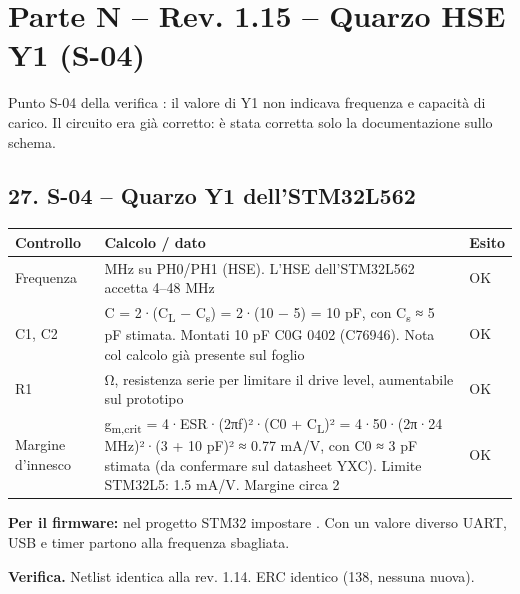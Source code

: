 \clearpage
\section[Parte N – Rev. 1.15 – Quarzo HSE Y1 (S-04)]{Parte N – Rev. 1.15 – Quarzo HSE Y1 (S-04)}

Punto S-04 della verifica : il valore di Y1 non indicava frequenza e capacità di carico. Il circuito era già corretto: è stata corretta solo la documentazione sullo schema.

\subsection[27. S-04 – Quarzo Y1 dell'STM32L562]{27. S-04 – Quarzo Y1 dell'STM32L562 }

{\small{}\setlength{\tabcolsep}{4pt}\renewcommand{\arraystretch}{1.1}
\begin{longtable}{>{\raggedright\arraybackslash}p{}>{\raggedright\arraybackslash}p{}>{\raggedright\arraybackslash}p{}}
\toprule
\textbf{Controllo} & \textbf{Calcolo /\allowbreak{} dato} & \textbf{Esito} \\
\midrule
\endhead
\bottomrule\endfoot
Frequenza & 24 MHz su PH0/\allowbreak{}PH1 (HSE). L'HSE dell'STM32L562 accetta 4–48 MHz & OK \\\midrule[0.15pt]
C1, C2 & C = 2·(C\textsubscript{L} − C\textsubscript{s}) = 2·(10 − 5) = 10 pF, con C\textsubscript{s} ≈ 5 pF stimata. Montati 10 pF C0G 0402 (C76946). Nota col calcolo già presente sul foglio & OK \\\midrule[0.15pt]
R1 & 0 Ω, resistenza serie per limitare il drive level, aumentabile sul prototipo & OK \\\midrule[0.15pt]
Margine d'innesco & g\textsubscript{m,crit} = 4·ESR·(2πf)²·(C0 + C\textsubscript{L})² = 4·50·(2π·24 MHz)²·(3 + 10 pF)² ≈ 0.77 mA/\allowbreak{}V, con C0 ≈ 3 pF stimata (da confermare sul datasheet YXC). Limite STM32L5: 1.5 mA/\allowbreak{}V. Margine circa 2 & OK \\
\end{longtable}}

\textbf{Per il firmware:} nel progetto STM32 impostare . Con un valore diverso UART, USB e timer partono alla frequenza sbagliata.

\textbf{Verifica.} Netlist identica alla rev. 1.14. ERC identico (138, nessuna nuova).

